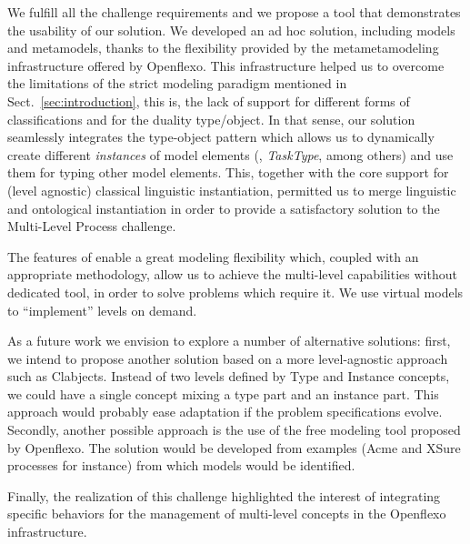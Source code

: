

We fulfill all the challenge requirements and we propose a tool that
demonstrates the usability of our solution. We developed an ad hoc solution,
including models and metamodels, thanks to the flexibility provided by the
metametamodeling infrastructure offered by Openflexo. This infrastructure
helped us to overcome the limitations of the strict modeling paradigm mentioned
in Sect.~\ref{sec:introduction}, this is, the lack of support for different
forms of classifications and for the duality type/object. In that sense, our
solution seamlessly integrates the type-object pattern which allows us to
dynamically create different \emph{instances} of model elements (\eg,
\emph{TaskType}, among others) and use them for typing other model elements.
This, together with the \FML core support for (level agnostic) classical
linguistic instantiation, permitted us to merge linguistic and ontological
instantiation in order to provide a satisfactory solution to the Multi-Level
Process challenge.

The features of \FML enable a great modeling flexibility which, coupled with an
appropriate methodology, allow us to achieve the multi-level capabilities
without dedicated tool, in order to solve problems which require it. We use
virtual models to \enquote{implement} levels on demand.


As a future work we envision to explore a number of alternative solutions:
first, we intend to propose another solution based on a more level-agnostic
approach such as Clabjects. Instead of two levels defined by Type and Instance
concepts, we could have a single concept mixing a type part and an instance
part. This approach would probably ease adaptation if the problem
specifications evolve. Secondly, another possible approach is the use of the
free modeling tool proposed by Openflexo. The solution would be developed from
examples (Acme and XSure processes for instance) from which models would be
identified.

Finally, the realization of this challenge highlighted the interest
of integrating specific behaviors for the management of multi-level concepts in
the Openflexo infrastructure. %
